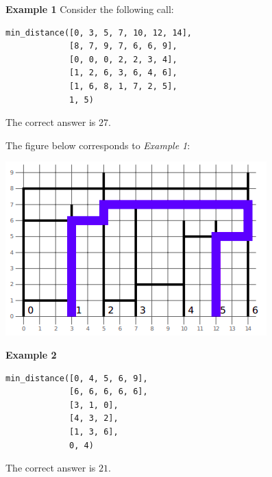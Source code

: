 \textbf{Example 1}
Consider the following call:

\begin{verbatim}
min_distance([0, 3, 5, 7, 10, 12, 14],
             [8, 7, 9, 7, 6, 6, 9],
             [0, 0, 0, 2, 2, 3, 4],
             [1, 2, 6, 3, 6, 4, 6],
             [1, 6, 8, 1, 7, 2, 5],
             1, 5)
\end{verbatim}

The correct answer is $27$.


The figure below corresponds to \textit{Example 1}:

\includegraphics{1.png}

\textbf{Example 2}

\begin{verbatim}
min_distance([0, 4, 5, 6, 9],
             [6, 6, 6, 6, 6],
             [3, 1, 0],
             [4, 3, 2],
             [1, 3, 6],
             0, 4)
\end{verbatim}

The correct answer is $21$.